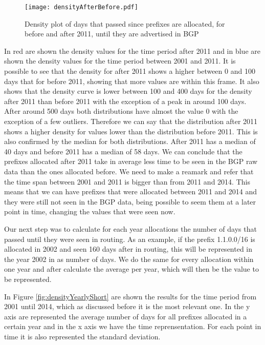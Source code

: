 \documentclass[11pt,a4paper]{scrreprt}
\begin{document}
\begin{figure}[!h]
\centering
\texttt{[image: densityAfterBefore.pdf]}
\caption{Density plot of days that passed since prefixes are allocated, for before and after 2011, until they are advertised in BGP}
\label{fig:densityAfterBefore2001}
\end{figure}

In red are shown the density values for the time period after 2011 and in blue are shown the density values for the time period between 2001 and 2011. It is possible to see that the density for after 2011 shows a higher between 0 and 100 days that for before 2011, showing that more values are within this frame. It also shows that the density curve is lower between 100 and 400 days for the density after 2011 than before 2011 with the exception of a peak in around 100 days. After around 500 days both distributions have almost the value 0 with the exception of a few outliers. Therefore we can say that the distribution after 2011 shows a higher density for values lower than the distribution before 2011. This is also confirmed by the median for both distributions. After 2011 has a median of 40 days and before 2011 has a median of 58 days. 
We can conclude that the prefixes allocated after 2011 take in average less time to be seen in the BGP raw data than the ones allocated before. We need to make a reamark and refer that the time span between 2001 and 2011 is bigger than from 2011 and 2014. This means that we can have prefixes that were allocated between 2011 and 2014 and they were still not seen in the BGP data, being possible to seem them at a later point in time, changing the values that were seen now.

Our next step was to calculate for each year allocations the number of days that passed until they were seen in routing. As an example, if the prefix 1.1.0.0/16 is allocated in 2002 and seen 160 days after in routing, this will be represented in the year 2002 in as number of days. We do the same for every allocation within one year and after calculate the average per year, which will then be the value to be represented.

In  Figure \ref{fig:densityYearlyShort} are shown the results for the time period from 2001 until 2014, which as discussed before it is the most relevant one. In the y axis are represented the average number of days for all prefixes allocated in a certain year and in the x axis we have the time reprensentation. For each point in time it is also represented the standard deviation.
\end{document}
